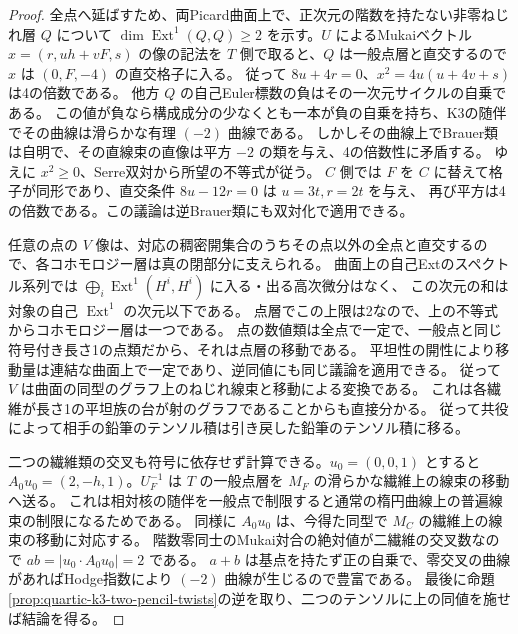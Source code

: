 \begin{proof}
全点へ延ばすため、両Picard曲面上で、正次元の階数を持たない非零ねじれ層 $Q$ について
$\dim\operatorname{Ext}^1(Q,Q)\ge2$ を示す。$U$ によるMukaiベクトル $x=(r,uh+vF,s)$ の像の記法を
$T$ 側で取ると、$Q$ は一般点層と直交するので $x$ は $(0,F,-4)$ の直交格子に入る。
従って $8u+4r=0$、$x^2=4u(u+4v+s)$ は4の倍数である。
他方 $Q$ の自己Euler標数の負はその一次元サイクルの自乗である。
この値が負なら構成成分の少なくとも一本が負の自乗を持ち、K3の随伴でその曲線は滑らかな有理 $(-2)$ 曲線である。
しかしその曲線上でBrauer類は自明で、その直線束の直像は平方 $-2$ の類を与え、4の倍数性に矛盾する。
ゆえに $x^2\ge0$、Serre双対から所望の不等式が従う。
$C$ 側では $F$ を $C$ に替えて格子が同形であり、直交条件 $8u-12r=0$ は $u=3t,r=2t$ を与え、
再び平方は4の倍数である。この議論は逆Brauer類にも双対化で適用できる。

任意の点の $V$ 像は、対応の稠密開集合のうちその点以外の全点と直交するので、各コホモロジー層は真の閉部分に支えられる。
曲面上の自己Extのスペクトル系列では
$\bigoplus_i\operatorname{Ext}^1(H^i,H^i)$ に入る・出る高次微分はなく、
この次元の和は対象の自己 $\operatorname{Ext}^1$ の次元以下である。
点層でこの上限は2なので、上の不等式からコホモロジー層は一つである。
点の数値類は全点で一定で、一般点と同じ符号付き長さ1の点類だから、それは点層の移動である。
平坦性の開性により移動量は連結な曲面上で一定であり、逆同値にも同じ議論を適用できる。
従って $V$ は曲面の同型のグラフ上のねじれ線束と移動による変換である。
これは各繊維が長さ1の平坦族の台が射のグラフであることからも直接分かる。
従って共役によって相手の鉛筆のテンソル積は引き戻した鉛筆のテンソル積に移る。

二つの繊維類の交叉も符号に依存せず計算できる。$u_0=(0,0,1)$ とすると
$A_0 u_0=(2,-h,1)$。$U_F^{-1}$ は $T$ の一般点層を $M_F$ の滑らかな繊維上の線束の移動へ送る。
これは相対核の随伴を一般点で制限すると通常の楕円曲線上の普遍線束の制限になるためである。
同様に $A_0u_0$ は、今得た同型で $M_C$ の繊維上の線束の移動に対応する。
階数零同士のMukai対合の絶対値が二繊維の交叉数なので $ab=|u_0\cdot A_0u_0|=2$ である。
$a+b$ は基点を持たず正の自乗で、零交叉の曲線があればHodge指数により $(-2)$ 曲線が生じるので豊富である。
最後に命題\ref{prop:quartic-k3-two-pencil-twists}の逆を取り、二つのテンソルに上の同値を施せば結論を得る。
\end{proof}
